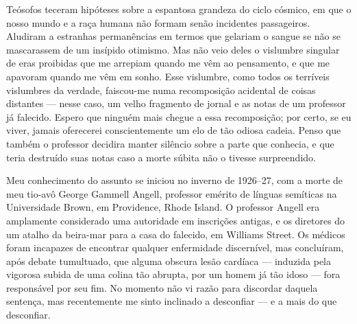 Teósofos teceram hipóteses sobre a espantosa grandeza do ciclo cósmico,
em que o nosso mundo e a raça humana não formam senão incidentes
passageiros. Aludiram a estranhas permanências em termos que gelariam o
sangue se não se mascarassem de um insípido otimismo. Mas não veio deles
o vislumbre singular de eras proibidas que me arrepiam quando me vêm ao
pensamento, e que me apavoram quando me vêm em sonho. Esse vislumbre,
como todos os terríveis vislumbres da verdade, faiscou-me numa
recomposição acidental de coisas distantes --- nesse caso, um velho
fragmento de jornal e as notas de um professor já falecido. Espero que
ninguém mais chegue a essa recomposição; por certo, se eu viver, jamais
oferecerei conscientemente um elo de tão odiosa cadeia. Penso que também
o professor decidira manter silêncio sobre a parte que conhecia, e que
teria destruído suas notas caso a morte súbita não o tivesse
surpreendido.

Meu conhecimento do assunto se iniciou no inverno de 1926--27, com a
morte de meu tio-avô George Gammell Angell, professor emérito de línguas
semíticas na Universidade Brown, em Providence, Rhode Island. O
professor Angell era amplamente considerado uma autoridade em inscrições
antigas, e os diretores do um atalho da beira-mar para a casa
do falecido, em Williams Street. Os médicos foram incapazes de encontrar
qualquer enfermidade discernível, mas concluíram, após debate
tumultuado, que alguma obscura lesão cardíaca --- induzida pela vigorosa
subida de uma colina tão abrupta, por um homem já tão idoso --- fora
responsável por seu fim. No momento não vi razão para discordar daquela
sentença, mas recentemente me sinto inclinado a desconfiar --- e a mais 
do que desconfiar. 



